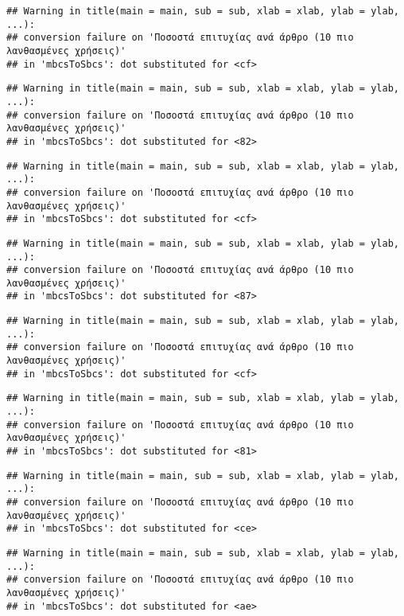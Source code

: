 \documentclass[
]{article}
\begin{document}
\begin{verbatim}
## Warning in title(main = main, sub = sub, xlab = xlab, ylab = ylab, ...):
## conversion failure on 'Ποσοστά επιτυχίας ανά άρθρο (10 πιο λανθασμένες χρήσεις)'
## in 'mbcsToSbcs': dot substituted for <cf>
\end{verbatim}

\begin{verbatim}
## Warning in title(main = main, sub = sub, xlab = xlab, ylab = ylab, ...):
## conversion failure on 'Ποσοστά επιτυχίας ανά άρθρο (10 πιο λανθασμένες χρήσεις)'
## in 'mbcsToSbcs': dot substituted for <82>
\end{verbatim}

\begin{verbatim}
## Warning in title(main = main, sub = sub, xlab = xlab, ylab = ylab, ...):
## conversion failure on 'Ποσοστά επιτυχίας ανά άρθρο (10 πιο λανθασμένες χρήσεις)'
## in 'mbcsToSbcs': dot substituted for <cf>
\end{verbatim}

\begin{verbatim}
## Warning in title(main = main, sub = sub, xlab = xlab, ylab = ylab, ...):
## conversion failure on 'Ποσοστά επιτυχίας ανά άρθρο (10 πιο λανθασμένες χρήσεις)'
## in 'mbcsToSbcs': dot substituted for <87>
\end{verbatim}

\begin{verbatim}
## Warning in title(main = main, sub = sub, xlab = xlab, ylab = ylab, ...):
## conversion failure on 'Ποσοστά επιτυχίας ανά άρθρο (10 πιο λανθασμένες χρήσεις)'
## in 'mbcsToSbcs': dot substituted for <cf>
\end{verbatim}

\begin{verbatim}
## Warning in title(main = main, sub = sub, xlab = xlab, ylab = ylab, ...):
## conversion failure on 'Ποσοστά επιτυχίας ανά άρθρο (10 πιο λανθασμένες χρήσεις)'
## in 'mbcsToSbcs': dot substituted for <81>
\end{verbatim}

\begin{verbatim}
## Warning in title(main = main, sub = sub, xlab = xlab, ylab = ylab, ...):
## conversion failure on 'Ποσοστά επιτυχίας ανά άρθρο (10 πιο λανθασμένες χρήσεις)'
## in 'mbcsToSbcs': dot substituted for <ce>
\end{verbatim}

\begin{verbatim}
## Warning in title(main = main, sub = sub, xlab = xlab, ylab = ylab, ...):
## conversion failure on 'Ποσοστά επιτυχίας ανά άρθρο (10 πιο λανθασμένες χρήσεις)'
## in 'mbcsToSbcs': dot substituted for <ae>
\end{verbatim}
\end{document}

